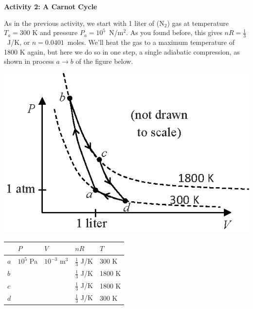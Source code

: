 \vspace{0.3in}

\pagebreak
\textbf{Activity 2: A Carnot Cycle}

As in the previous activity, we start with 1 liter of ($\textrm{N}_2$) gas at temperature $T_a = 300$ K and pressure $P_a=10^5$~N/m$^2$.   As you found before, this gives $nR=\frac{1}{3}$~J/K, or $n=0.0401$~moles.  We'll heat the gas to a maximum temperature of 1800 K again, but here we do so in one step, a single adiabatic compression, as shown in process $a \rightarrow b$ of the figure below.

\begin{minipage}{0.44\textwidth}
\includegraphics[width=1.0\textwidth]{ideal_gas_cycles/carnot_cycle.eps}
\end{minipage}
\begin{minipage}{0.54\textwidth}
\vspace{0.1 in}
{\renewcommand{\arraystretch}{2.0}
\begin{tabular}{| C{0.3in} | C{0.6in} | C{0.6in} | C{0.6in} | C{0.6in} |}
\hline
& $P$ & $V$ & $nR$ & $T$ \\ \hline
$a$ & $10^5$ Pa & $10^{-3}$ m$^3$ & $\frac{1}{3}$ J/K & 300 K \\ \hline
$b$ &                  &                            & $\frac{1}{3}$ J/K & 1800 K \\ \hline
$c$ &                  &                            & $\frac{1}{3}$ J/K & 1800 K \\ \hline
$d$ &                  &                            & $\frac{1}{3}$ J/K & 300 K \\ \hline
\end{tabular}}
\end{minipage}


